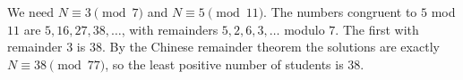 We need $N\equiv3\pmod7$ and $N\equiv5\pmod{11}$. The numbers congruent to $5$ mod $11$ are $5,16,27,38,\ldots$, with remainders $5,2,6,3,\ldots$ modulo $7$. The first with remainder $3$ is $38$. By the Chinese remainder theorem the solutions are exactly $N\equiv38\pmod{77}$, so the least positive number of students is $\boxed{38}$.
